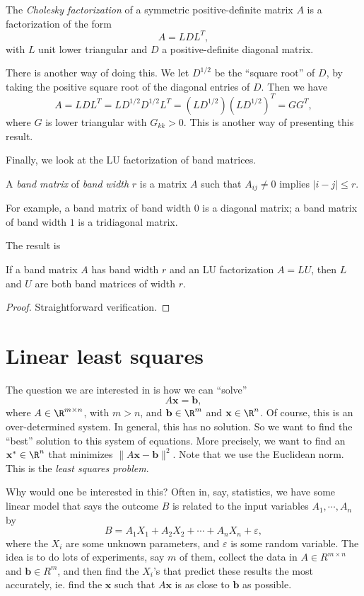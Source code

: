 \documentclass[a4paper]{article}
\begin{document}
\begin{defi}
  The \emph{Cholesky factorization} of a symmetric positive-definite matrix $A$ is a factorization of the form
  \[
    A = LDL^T,
  \]
  with $L$ unit lower triangular and $D$ a positive-definite diagonal matrix.
\end{defi}
There is another way of doing this. We let $D^{1/2}$ be the ``square root'' of $D$, by taking the positive square root of the diagonal entries of $D$. Then we have
\[
  A = LDL^T = LD^{1/2}D^{1/2}L^T = (LD^{1/2})(LD^{1/2})^T = GG^T,
\]
where $G$ is lower triangular with $G_{kk} > 0$. This is another way of presenting this result.

Finally, we look at the LU factorization of band matrices.
\begin{defi}
  A \emph{band matrix} of \emph{band width} $r$ is a matrix $A$ such that $A_{ij} \not= 0$ implies $|i - j| \leq r$.
\end{defi}
For example, a band matrix of band width $0$ is a diagonal matrix; a band matrix of band width $1$ is a tridiagonal matrix.

The result is
\begin{prop}
  If a band matrix $A$ has band width $r$ and an LU factorization $A = LU$, then $L$ and $U$ are both band matrices of width $r$.
\end{prop}

\begin{proof}
  Straightforward verification.
\end{proof}

\section{Linear least squares}
The question we are interested in is how we can ``solve''
\[
  A\mathbf{x} = \mathbf{b},
\]
where $A \in \R^{m \times n}$, with $m > n$, and $\mathbf{b} \in \R^m$ and $\mathbf{x} \in \R^n$. Of course, this is an over-determined system. In general, this has no solution. So we want to find the ``best'' solution to this system of equations. More precisely, we want to find an $\mathbf{x}^* \in \R^n$ that minimizes $\|A\mathbf{x} - \mathbf{b}\|^2$. Note that we use the Euclidean norm. This is the \emph{least squares problem}.

Why would one be interested in this? Often in, say, statistics, we have some linear model that says the outcome $B$ is related to the input variables $A_1, \cdots, A_n$ by
\[
  B = A_1 X_1 + A_2 X_2 + \cdots + A_n X_n + \varepsilon,
\]
where the $X_i$ are some unknown parameters, and $\varepsilon$ is some random variable. The idea is to do lots of experiments, say $m$ of them, collect the data in $A \in R^{m \times n}$ and $\mathbf{b} \in R^m$, and then find the $X_i$'s that predict these results the most accurately, ie. find the $\mathbf{x}$ such that $A\mathbf{x}$ is as close to $\mathbf{b}$ as possible.
\end{document}
